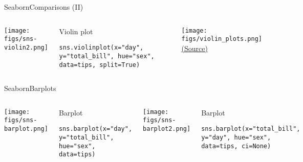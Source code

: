 \documentclass[10pt,compress]{beamer} %
\begin{document}
\begin{frame}[fragile]{Seaborn}{Comparisons (II)}
	\begin{columns}
	\texttt{[image: figs/sns-violin2.png]}\\
	\begin{exampleblock}{\footnotesize{Violin plot}}
	\vspace{-0.2cm} 
	\begin{lstlisting}[basicstyle=\tiny]
	sns.violinplot(x="day", y="total_bill", hue="sex", data=tips, split=True)
	\end{lstlisting}
	\vspace{-0.2cm} 
	\end{exampleblock}

	\centering \texttt{[image: figs/violin\_plots.png]}\\
	\tiny \centering \href{https://xkcd.com/1967/}{(Source)}
	\end{columns}
\end{frame}

\begin{frame}[fragile]{Seaborn}{Barplots}
	\begin{columns}
	\texttt{[image: figs/sns-barplot.png]}\\
	\begin{exampleblock}{\footnotesize{Barplot}}
	\vspace{-0.2cm} 
	\begin{lstlisting}[basicstyle=\tiny]
	sns.barplot(x="day", y="total_bill", hue="sex", data=tips)
	\end{lstlisting}
	\vspace{-0.2cm} 
	\end{exampleblock}

	\texttt{[image: figs/sns-barplot2.png]}\\
	\begin{exampleblock}{\footnotesize{Barplot}}
	\vspace{-0.2cm} 
	\begin{lstlisting}[basicstyle=\tiny]
sns.barplot(x="total_bill", y="day", hue="sex", data=tips, ci=None)
	\end{lstlisting}
	\vspace{-0.2cm} 
	\end{exampleblock}
	\end{columns}
\end{frame}
\end{document}
